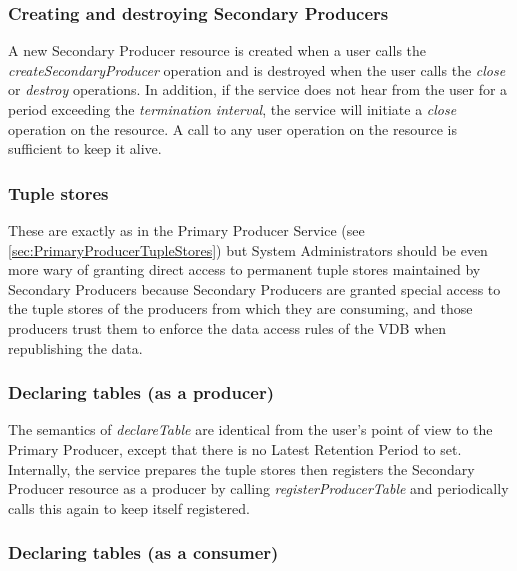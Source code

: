\subsubsection{Creating and destroying Secondary Producers}\label{sec:SecondaryProducerCreating}

A new Secondary Producer resource is created when a user calls the
\textit{createSecondaryProducer} operation and is destroyed when the user calls
the \textit{close} or \textit{destroy} operations. In addition,
if the service does not hear from the user for a period exceeding the
\textit{termination interval}, the service will initiate a \textit{close} operation
on the resource. A call to any user operation on the resource is sufficient
to keep it alive.

\subsubsection{Tuple stores}\label{sec:SecondaryProducerTupleStores}

These are exactly as in the Primary Producer Service (see
\ref{sec:PrimaryProducerTupleStores}) but System Administrators should
be even more wary of granting direct access to permanent tuple stores
maintained by Secondary Producers because Secondary Producers are granted
special access to the tuple stores of the producers from which they are
consuming, and those producers trust them to enforce the data access rules
of the VDB when republishing the data.

\subsubsection{Declaring tables (as a producer)}\label{sec:SecondaryProducerDeclaring}

The semantics of \textit{declareTable} are identical from the user's point of 
view to the Primary Producer, except that there is no Latest Retention Period 
to set. Internally, the service prepares the tuple stores then registers the 
Secondary Producer resource as a producer by calling 
\textit{registerProducerTable} and periodically calls this again to keep itself 
registered.

\subsubsection{Declaring tables (as a consumer)}\label{sec:ConsumerDeclaring}

